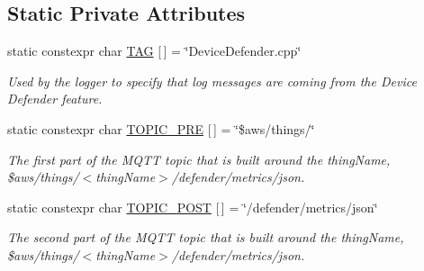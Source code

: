 \subsection*{Static Private Attributes}
\begin{DoxyCompactItemize}
\item 
\mbox{\label{class_aws_1_1_iot_1_1_device_client_1_1_device_defender_1_1_device_defender_feature_a418d69418549311e3026386766ca6638}} 
static constexpr char \hyperlink{class_aws_1_1_iot_1_1_device_client_1_1_device_defender_1_1_device_defender_feature_a418d69418549311e3026386766ca6638}{T\+AG} \mbox{[}$\,$\mbox{]} = \char`\"{}Device\+Defender.\+cpp\char`\"{}
\begin{DoxyCompactList}\small\item\em Used by the logger to specify that log messages are coming from the Device Defender feature. \end{DoxyCompactList}\item 
\mbox{\label{class_aws_1_1_iot_1_1_device_client_1_1_device_defender_1_1_device_defender_feature_a184874a29b7c367e898ec386fff1a83f}} 
static constexpr char \hyperlink{class_aws_1_1_iot_1_1_device_client_1_1_device_defender_1_1_device_defender_feature_a184874a29b7c367e898ec386fff1a83f}{T\+O\+P\+I\+C\+\_\+\+P\+RE} \mbox{[}$\,$\mbox{]} = \char`\"{}\$aws/things/\char`\"{}
\begin{DoxyCompactList}\small\item\em The first part of the M\+Q\+TT topic that is built around the thing\+Name, \$aws/things/$<$thing\+Name$>$/defender/metrics/json. \end{DoxyCompactList}\item 
\mbox{\label{class_aws_1_1_iot_1_1_device_client_1_1_device_defender_1_1_device_defender_feature_ab6407a1677ee82a399fa6ab04fdcaeac}} 
static constexpr char \hyperlink{class_aws_1_1_iot_1_1_device_client_1_1_device_defender_1_1_device_defender_feature_ab6407a1677ee82a399fa6ab04fdcaeac}{T\+O\+P\+I\+C\+\_\+\+P\+O\+ST} \mbox{[}$\,$\mbox{]} = \char`\"{}/defender/metrics/json\char`\"{}
\begin{DoxyCompactList}\small\item\em The second part of the M\+Q\+TT topic that is built around the thing\+Name, \$aws/things/$<$thing\+Name$>$/defender/metrics/json. \end{DoxyCompactList}\item 

\end{DoxyCompactItemize}
